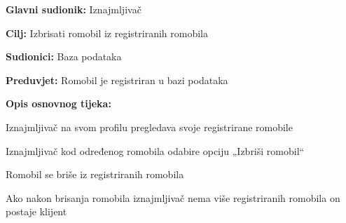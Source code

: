 						\begin{packed_item}
							
							\item \textbf{Glavni sudionik: }Iznajmljivač
							\item  \textbf{Cilj: }Izbrisati romobil iz registriranih romobila
							\item  \textbf{Sudionici:} Baza podataka
							\item  \textbf{Preduvjet:} Romobil je registriran u bazi podataka 
							\item  \textbf{Opis osnovnog tijeka:}
							
							\item[] \begin{packed_enum}
								
								\item Iznajmljivač na svom profilu pregledava svoje registrirane romobile 
								\item Iznajmljivač kod određenog romobila odabire opciju „Izbriši romobil“ 
								\item Romobil se briše iz registriranih romobila 
								\item Ako nakon brisanja romobila iznajmljivač nema više registriranih romobila on postaje klijent   
							\end{packed_enum}
							
						\end{packed_item}
						\noindent {}
